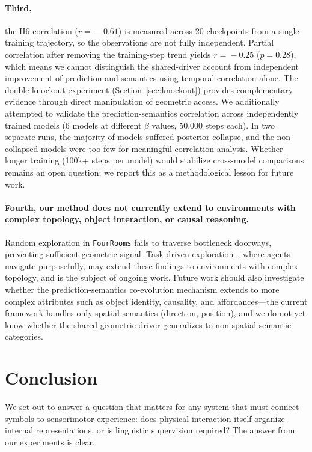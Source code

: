 \documentclass{article}
\begin{document}
\paragraph{Third,} the H6 correlation ($r\!=\!-0.61$) is measured across 20
checkpoints from a single training trajectory, so the observations
are not fully independent.
Partial correlation after removing the training-step trend yields
$r\!=\!-0.25$ ($p\!=\!0.28$), which means we cannot distinguish the
shared-driver account from independent improvement of prediction and
semantics using temporal correlation alone.
The double knockout experiment (Section~\ref{sec:knockout})
provides complementary evidence through direct manipulation of
geometric access.
We additionally attempted to validate the prediction-semantics
correlation across independently trained models (6 models at different
$\beta$ values, 50{,}000 steps each).
In two separate runs, the majority of models suffered posterior
collapse, and the non-collapsed models were too few for meaningful
correlation analysis.
Whether longer training (100k+ steps per model) would stabilize
cross-model comparisons remains an open question;
we report this as a methodological lesson for future work.

\paragraph{Fourth, our method does not currently extend to environments with
complex topology, object interaction, or causal reasoning.}
Random exploration in \texttt{FourRooms} fails to traverse bottleneck
doorways, preventing sufficient geometric signal.
Task-driven exploration~\cite{pathak2017curiosity}, where agents
navigate purposefully, may extend these findings to environments with
complex topology, and is the subject of ongoing work.
Future work should also investigate whether the prediction-semantics
co-evolution mechanism extends to more complex attributes
such as object identity, causality, and affordances---the
current framework handles only spatial semantics (direction, position),
and we do not yet know whether the shared geometric driver generalizes
to non-spatial semantic categories.


\section{Conclusion}
\label{sec:conclusion}

We set out to answer a question that matters for any system
that must connect symbols to sensorimotor experience:
does physical interaction itself organize internal representations,
or is linguistic supervision required?
The answer from our experiments is clear.
\end{document}
